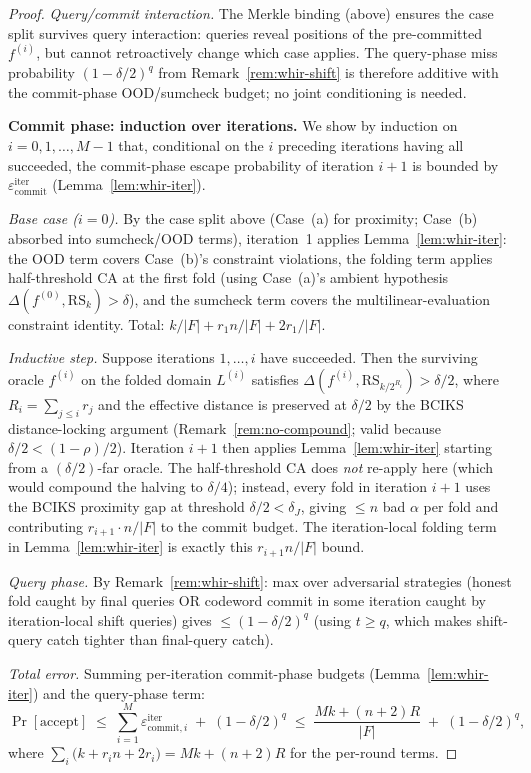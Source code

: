 \documentclass[11pt]{article}
\newcommand{\RS}{\mathrm{RS}}
\begin{document}
\begin{proof}
\emph{Query/commit interaction.} The Merkle binding (above) ensures the case split survives query interaction: queries reveal positions of the pre-committed $f^{(i)}$, but cannot retroactively change which case applies. The query-phase miss probability $(1-\delta/2)^q$ from Remark~\ref{rem:whir-shift} is therefore additive with the commit-phase OOD/sumcheck budget; no joint conditioning is needed.

\textbf{Commit phase: induction over iterations.} We show by induction on $i = 0, 1, \ldots, M-1$ that, conditional on the $i$ preceding iterations having all succeeded, the commit-phase escape probability of iteration $i{+}1$ is bounded by $\varepsilon^{\mathrm{iter}}_{\mathrm{commit}}$ (Lemma~\ref{lem:whir-iter}).

\emph{Base case ($i = 0$).} By the case split above (Case~(a) for proximity; Case~(b) absorbed into sumcheck/OOD terms), iteration~1 applies Lemma~\ref{lem:whir-iter}: the OOD term covers Case~(b)'s constraint violations, the folding term applies half-threshold CA at the first fold (using Case~(a)'s ambient hypothesis $\Delta(f^{(0)}, \RS_k) > \delta$), and the sumcheck term covers the multilinear-evaluation constraint identity. Total: $k/|F| + r_1 n/|F| + 2 r_1/|F|$.

\emph{Inductive step.} Suppose iterations $1, \ldots, i$ have succeeded. Then the surviving oracle $f^{(i)}$ on the folded domain $L^{(i)}$ satisfies $\Delta(f^{(i)}, \RS_{k/2^{R_i}}) > \delta/2$, where $R_i = \sum_{j \leq i} r_j$ and the effective distance is preserved at $\delta/2$ by the BCIKS distance-locking argument (Remark~\ref{rem:no-compound}; valid because $\delta/2 < (1{-}\rho)/2$). Iteration $i{+}1$ then applies Lemma~\ref{lem:whir-iter} starting from a $(\delta/2)$-far oracle. The half-threshold CA does \emph{not} re-apply here (which would compound the halving to $\delta/4$); instead, every fold in iteration $i{+}1$ uses the BCIKS proximity gap at threshold $\delta/2 < \delta_J$, giving $\leq n$ bad $\alpha$ per fold and contributing $r_{i+1} \cdot n/|F|$ to the commit budget. The iteration-local folding term in Lemma~\ref{lem:whir-iter} is exactly this $r_{i+1} n/|F|$ bound.

\emph{Query phase.} By Remark~\ref{rem:whir-shift}: max over adversarial strategies (honest fold caught by final queries OR codeword commit in some iteration caught by iteration-local shift queries) gives $\leq (1{-}\delta/2)^q$ (using $t \geq q$, which makes shift-query catch tighter than final-query catch).

\emph{Total error.} Summing per-iteration commit-phase budgets (Lemma~\ref{lem:whir-iter}) and the query-phase term:
$$\Pr[\text{accept}] \;\leq\; \sum_{i=1}^M \varepsilon^{\mathrm{iter}}_{\mathrm{commit},i} \;+\; (1{-}\delta/2)^q \;\leq\; \frac{Mk + (n{+}2)R}{|F|} \;+\; (1{-}\delta/2)^q,$$
where $\sum_i \bigl(k + r_i n + 2 r_i\bigr) = Mk + (n{+}2)R$ for the per-round terms.
\end{proof}
\end{document}
